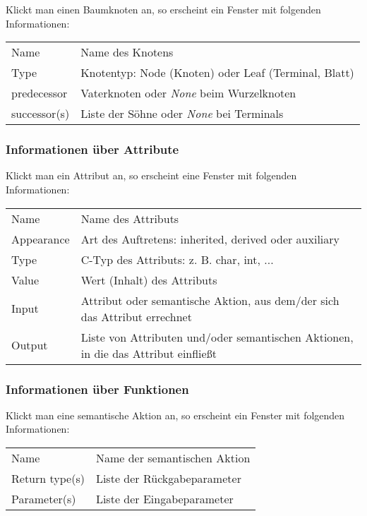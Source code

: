 Klickt man einen Baumknoten an, so erscheint ein Fenster mit folgenden Informationen:

\bigskip
\begin{tabular}{|l|l|}
\hline
Name         &   Name des Knotens  \\
Type         &   Knotentyp: Node (Knoten) oder Leaf (Terminal, Blatt) \\
predecessor  &   Vaterknoten oder {\it None} beim Wurzelknoten      \\
successor(s) &   Liste der S\"ohne oder {\it None} bei Terminals    \\
\hline
\end{tabular}
\bigskip

\subsubsection{Informationen \"uber Attribute}

Klickt man ein Attribut an, so erscheint eine Fenster mit folgenden Informationen:

\bigskip
\begin{tabular}{|l|p{10.1cm}|}
\hline
Name         &   Name des Attributs   \\
Appearance   &   Art des Auftretens: inherited, derived oder auxiliary  \\
Type         &   C-Typ des Attributs: z. B. char, int, ...     \\
Value        &   Wert (Inhalt) des Attributs      \\
Input        &   Attribut oder semantische Aktion, aus dem/der sich das Attribut errechnet   \\
Output       &   Liste von Attributen und/oder semantischen Aktionen, in die das Attribut einflie\ss{}t   \\
\hline
\end{tabular}
\bigskip

\subsubsection{Informationen \"uber Funktionen}

Klickt man eine semantische Aktion an, so erscheint ein Fenster mit folgenden Informationen:

\bigskip
\begin{tabular}{|l|l|}
\hline
Name           & Name der semantischen Aktion     \\
Return type(s) & Liste der R\"uckgabeparameter    \\
Parameter(s)   & Liste der Eingabeparameter      \\
\hline
\end{tabular}
\bigskip

